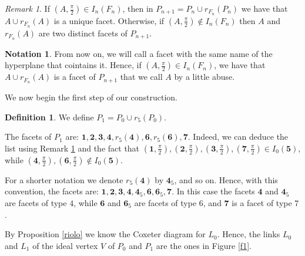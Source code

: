\documentclass{amsart}
\theoremstyle{definition}
\newtheorem{defn}[lemma]{Definition}
\newtheorem{notat}[lemma]{Notation}
\theoremstyle{remark}
\newtheorem{rem}[lemma]{Remark}
\newcommand{\lk}{L}
\begin{document}
\begin{rem}
\label{lista}
    If $(A,\frac{\pi}{2})\in I_n(F_n)$, then in $P_{n+1}=P_n\cup r_{F_n}(P_n)$ we have that $A\cup r_{F_n}(A)$ is a unique facet. Otherwise, if $(A,\frac{\pi}{2})\notin I_n(F_n)$ then $A$ and $r_{F_n}(A)$ are two distinct facets of $P_{n+1}$.
\end{rem}

\begin{notat}
    From now on, we will call a facet with the same name of the hyperplane that cointains it. %
    Hence, if $(A,\frac{\pi}{2})\in I_n(F_n)$, we have that $A\cup r_{F_n}(A)$ is a facet of $P_{n+1}$ that we call $A$ by a little abuse. %
\end{notat}


We now begin the first step of our construction.

\begin{defn}
    We define $P_1=P_0 \cup r_5(P_0)$.
\end{defn}

The facets of $P_1$ are: $\textbf{1}, \textbf{2},\textbf{3}, \textbf{4}, r_5(\textbf{4}), \textbf{6}, r_5(\textbf{6}), \textbf{7}$. Indeed, we can deduce the list using Remark \ref{lista} and the fact that $(\textbf{1},\frac{\pi}{2}),(\textbf{2},\frac{\pi}{2}),(\textbf{3},\frac{\pi}{2}),(\textbf{7},\frac{\pi}{2})\in I_0(\textbf{5})$, while $(\textbf{4},\frac{\pi}{2}),(\textbf{6},\frac{\pi}{2})\notin I_0(\textbf{5})$.

For a shorter notation we denote $r_5(\textbf{4})$ by $\textbf{4}_5$, and so on. Hence, with this convention, the facets are:
$\textbf{1}, \textbf{2}, \textbf{3}, \textbf{4}, \textbf{4}_5, \textbf{6}, \textbf{6}_5, \textbf{7}$. In this case the facets $\textbf{4}$ and $\textbf{4}_5$ are facets of type $4$, while $\textbf{6}$ and $\textbf{6}_5$ are facets of type $6$, and $\textbf{7}$ is a facet of type $7$.


By Proposition \ref{riolo} we know the Coxeter diagram for $\lk_0$.
Hence, the links $\lk_0$ and $\lk_1$ of the ideal vertex $V$ of $P_0$ and $P_1$ are the ones in Figure \ref{f1}.
\end{document}
